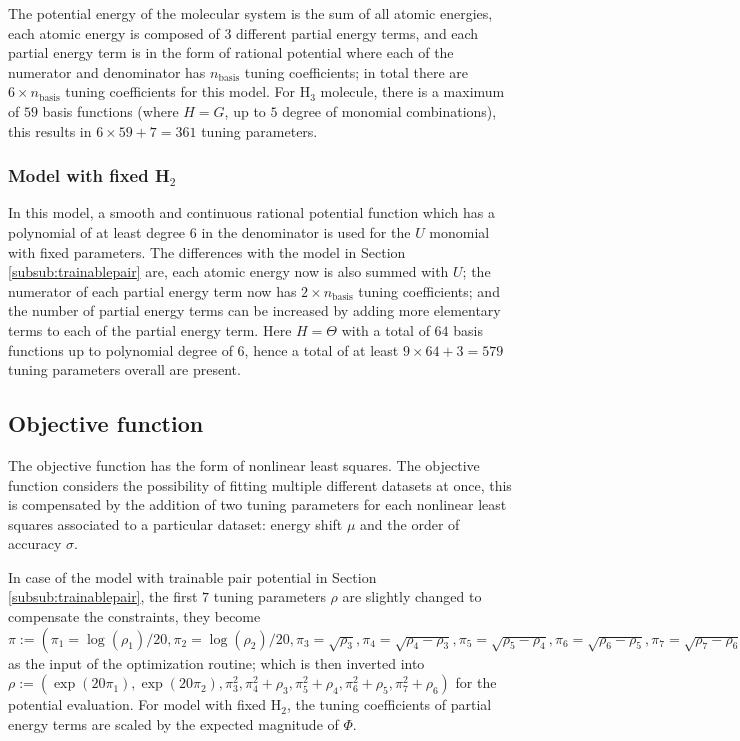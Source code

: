 \documentclass[12pt]{article}
\begin{document}
The potential energy of the molecular system is the sum of all atomic energies, each atomic energy is composed of $3$ different partial energy terms, and each partial energy term is in the form of rational potential where each of the numerator and denominator has $n_{\text{basis}}$ tuning coefficients; in total there are $6 \times n_{\text{basis}}$ tuning coefficients for this model. For H$_3$ molecule, there is a maximum of $59$ basis functions (where $H = G$, up to $5$ degree of monomial combinations), this results in $6 \times 59 + 7 = 361$ tuning parameters.


\subsubsection{Model with fixed H$_2$}
In this model, a smooth and continuous rational potential function which has a polynomial of at least degree 6 in the denominator is used for the $U$ monomial with fixed parameters. The differences with the model in Section \ref{subsub:trainablepair} are, each atomic energy now is also summed with $U$; the numerator of each partial energy term now has $2 \times n_{\text{basis}}$ tuning coefficients; and the number of partial energy terms can be increased by adding more elementary terms to each of the partial energy term. Here $H = \Theta$ with a total of $64$ basis functions up to polynomial degree of $6$, hence a total of at least $9 \times 64 + 3 = 579$ tuning parameters overall are present.


\subsection{Objective function}
The objective function has the form of nonlinear least squares. The objective function considers the possibility of fitting multiple different datasets at once, this is compensated by the addition of two tuning parameters for each nonlinear least squares associated to a particular dataset: energy shift $\mu$ and the order of accuracy $\sigma$. 

In case of the model with trainable pair potential in Section \ref{subsub:trainablepair}, the first $7$ tuning parameters $\rho$ are slightly changed to compensate the constraints, they become $\pi := (\pi_1 = \log(\rho_1)/20, \pi_2 = \log(\rho_2)/20, \pi_3 = \sqrt{\rho_3}, \pi_4 = \sqrt{\rho_4 - \rho_3}, \pi_5 = \sqrt{\rho_5 - \rho_4}, \pi_6 = \sqrt{\rho_6 - \rho_5}, \pi_7 = \sqrt{\rho_7 - \rho_6})$ as the input of the optimization routine; which is then inverted into $\rho := (\exp(20\pi_1), \exp(20\pi_2), \pi_3^2,\pi_4^2 + \rho_3, \pi_5^2+\rho_4, \pi_6^2+\rho_5, \pi_7^2+\rho_6)$ for the potential evaluation. For model with fixed H$_2$, the tuning coefficients of partial energy terms are scaled by the expected magnitude of $\Phi$.
\end{document}
